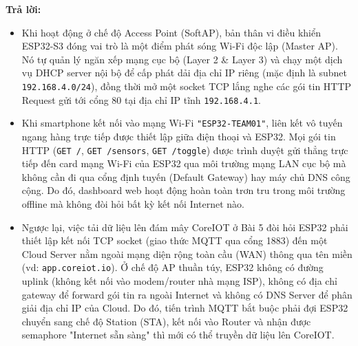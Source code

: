 \begin{tcolorbox}[colback=blue!3,colframe=blue!75!black,title=\textbf{Câu hỏi 1: Vì sao dashboard hoạt động được mà không cần Internet tại 192.168.4.1, trong khi việc tải dữ liệu lên cloud (Bài tập 5) không thể chạy ở chế độ AP?}]
\textbf{Trả lời:}
\begin{itemize}[leftmargin=*]
    \item Khi hoạt động ở chế độ Access Point (SoftAP), bản thân vi điều khiển ESP32-S3 đóng vai trò là một điểm phát sóng Wi-Fi độc lập (Master AP). Nó tự quản lý ngăn xếp mạng cục bộ (Layer 2 \& Layer 3) và chạy một dịch vụ DHCP server nội bộ để cấp phát dải địa chỉ IP riêng (mặc định là subnet \texttt{192.168.4.0/24}), đồng thời mở một socket TCP lắng nghe các gói tin HTTP Request gửi tới cổng 80 tại địa chỉ IP tĩnh \texttt{192.168.4.1}.
    \item Khi smartphone kết nối vào mạng Wi-Fi \texttt{"ESP32-TEAM01"}, liên kết vô tuyến ngang hàng trực tiếp được thiết lập giữa điện thoại và ESP32. Mọi gói tin HTTP (\texttt{GET /}, \texttt{GET /sensors}, \texttt{GET /toggle}) được trình duyệt gửi thẳng trực tiếp đến card mạng Wi-Fi của ESP32 qua môi trường mạng LAN cục bộ mà không cần đi qua cổng định tuyến (Default Gateway) hay máy chủ DNS công cộng. Do đó, dashboard web hoạt động hoàn toàn trơn tru trong môi trường offline mà không đòi hỏi bất kỳ kết nối Internet nào.
    \item Ngược lại, việc tải dữ liệu lên đám mây CoreIOT ở Bài 5 đòi hỏi ESP32 phải thiết lập kết nối TCP socket (giao thức MQTT qua cổng 1883) đến một Cloud Server nằm ngoài mạng diện rộng toàn cầu (WAN) thông qua tên miền (vd: \texttt{app.coreiot.io}). Ở chế độ AP thuần túy, ESP32 không có đường uplink (không kết nối vào modem/router nhà mạng ISP), không có địa chỉ gateway để forward gói tin ra ngoài Internet và không có DNS Server để phân giải địa chỉ IP của Cloud. Do đó, tiến trình MQTT bắt buộc phải đợi ESP32 chuyển sang chế độ Station (STA), kết nối vào Router và nhận được semaphore "Internet sẵn sàng" thì mới có thể truyền dữ liệu lên CoreIOT.
\end{itemize}
\end{tcolorbox}

\vspace{0.3cm}

